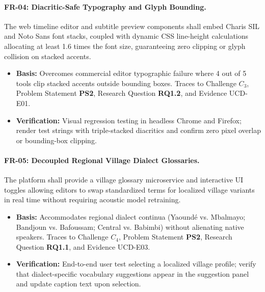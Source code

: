 \documentclass[a4paper,11pt]{article}
\begin{document}
\paragraph{FR-04: Diacritic-Safe Typography and Glyph Bounding.}
The web timeline editor and subtitle preview components shall embed Charis SIL and Noto Sans font stacks, coupled with dynamic CSS line-height calculations allocating at least 1.6 times the font size, guaranteeing zero clipping or glyph collision on stacked accents.
\begin{itemize}
    \item \textbf{Basis:} Overcomes commercial editor typographic failure where 4 out of 5 tools clip stacked accents outside bounding boxes. Traces to Challenge $C_3$, Problem Statement \textbf{PS2}, Research Question \textbf{RQ1.2}, and Evidence UCD-E01.
    \item \textbf{Verification:} Visual regression testing in headless Chrome and Firefox; render test strings with triple-stacked diacritics and confirm zero pixel overlap or bounding-box clipping.
\end{itemize}

\paragraph{FR-05: Decoupled Regional Village Dialect Glossaries.}
The platform shall provide a village glossary microservice and interactive UI toggles allowing editors to swap standardized terms for localized village variants in real time without requiring acoustic model retraining.
\begin{itemize}
    \item \textbf{Basis:} Accommodates regional dialect continua (Yaound\'e vs. Mbalmayo; Bandjoun vs. Bafoussam; Central vs. Babimbi) without alienating native speakers. Traces to Challenge $C_4$, Problem Statement \textbf{PS2}, Research Question \textbf{RQ1.1}, and Evidence UCD-E03.
    \item \textbf{Verification:} End-to-end user test selecting a localized village profile; verify that dialect-specific vocabulary suggestions appear in the suggestion panel and update caption text upon selection.
\end{itemize}
\end{document}
